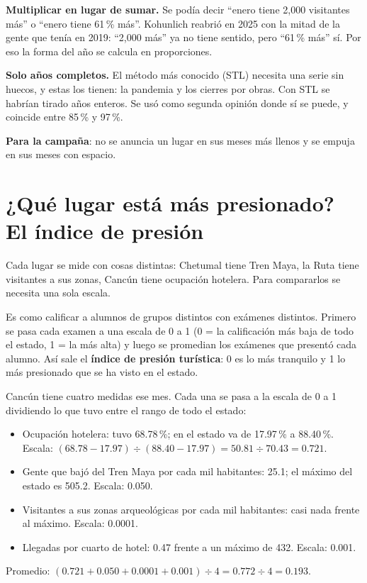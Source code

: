 \begin{porque}
\textbf{Multiplicar en lugar de sumar.} Se podía decir ``enero tiene 2,000 visitantes más'' o ``enero tiene 61\,\% más''.
Kohunlich reabrió en 2025 con la mitad de la gente que tenía en 2019: ``2,000 más'' ya no tiene sentido, pero ``61\,\%
más'' sí. Por eso la forma del año se calcula en proporciones.

\textbf{Solo años completos.} El método más conocido (STL) necesita una serie sin huecos, y estas los tienen: la pandemia
y los cierres por obras. Con STL se habrían tirado años enteros. Se usó como segunda opinión donde sí se puede, y coincide
entre 85\,\% y 97\,\%.
\end{porque}

\textbf{Para la campaña}: no se anuncia un lugar en sus meses más llenos y se empuja en sus meses con espacio.

\section{¿Qué lugar está más presionado? El índice de presión}
Cada lugar se mide con cosas distintas: Chetumal tiene Tren Maya, la Ruta tiene visitantes a sus zonas, Cancún tiene
ocupación hotelera. Para compararlos se necesita una sola escala.

\begin{intuicion}
Es como calificar a alumnos de grupos distintos con exámenes distintos. Primero se pasa cada examen a una escala de 0 a 1
(0 = la calificación más baja de todo el estado, 1 = la más alta) y luego se promedian los exámenes que presentó cada
alumno. Así sale el \textbf{índice de presión turística}: 0 es lo más tranquilo y 1 lo más presionado que se ha visto en el
estado.
\end{intuicion}

\begin{ejemplo}
Cancún tiene cuatro medidas ese mes. Cada una se pasa a la escala de 0 a 1 dividiendo lo que tuvo entre el rango de todo
el estado:
\begin{itemize}
\item Ocupación hotelera: tuvo 68.78\,\%; en el estado va de 17.97\,\% a 88.40\,\%. Escala:
  $(68.78-17.97)\div(88.40-17.97)=50.81\div70.43=0.721$.
\item Gente que bajó del Tren Maya por cada mil habitantes: 25.1; el máximo del estado es 505.2. Escala: 0.050.
\item Visitantes a sus zonas arqueológicas por cada mil habitantes: casi nada frente al máximo. Escala: 0.0001.
\item Llegadas por cuarto de hotel: 0.47 frente a un máximo de 432. Escala: 0.001.
\end{itemize}
Promedio: $(0.721+0.050+0.0001+0.001)\div4=0.772\div4=\mathbf{0.193}$.
\end{ejemplo}

